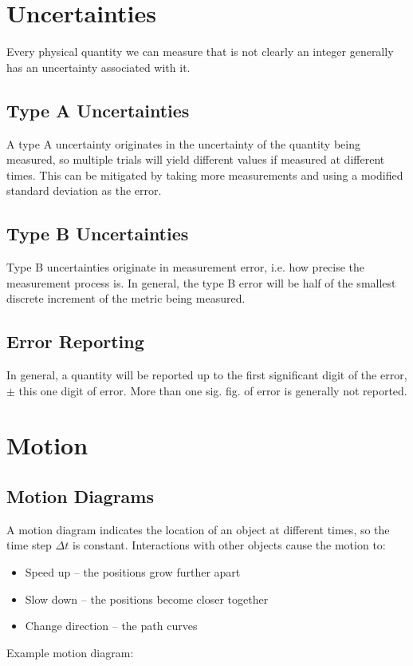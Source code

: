 \documentclass{article}
\begin{document}
\section{Uncertainties}
Every physical quantity we can measure that is not clearly an integer generally has an uncertainty associated with it. 
\subsection{Type A Uncertainties}
A type A uncertainty originates in the uncertainty of the quantity being measured, so multiple trials will yield different values if measured at different times. This can be mitigated by taking more measurements and using a modified standard deviation as the error.
\subsection{Type B Uncertainties}
Type B uncertainties originate in measurement error, i.e. how precise the measurement process is. In general, the type B error will be half of the smallest discrete increment of the metric being measured.
\subsection{Error Reporting}
In general, a quantity will be reported up to the first significant digit of the error, $\pm$ this one digit of error. More than one sig. fig. of error is generally not reported.
\pagebreak
\section{Motion}
\subsection{Motion Diagrams}
A motion diagram indicates the location of an object at different times, so the time step $\Delta t$ is constant. Interactions with other objects cause the motion to:

\begin{itemize}
    \item Speed up -- the positions grow further apart
    \item Slow down -- the positions become closer together
    \item Change direction -- the path curves
\end{itemize}

Example motion diagram:
\end{document}
